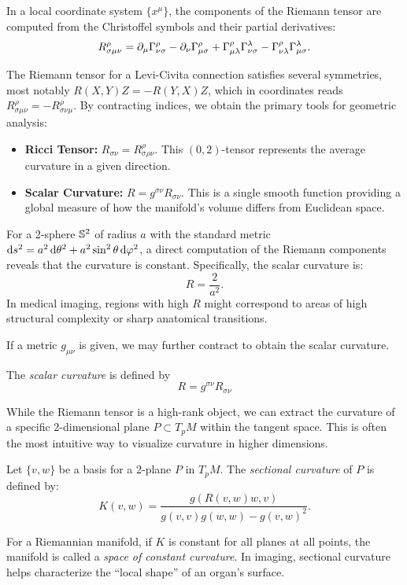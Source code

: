 In a local coordinate system $\{x^\mu\}$, the components of the Riemann tensor are computed from the Christoffel symbols and their partial derivatives:
\[%
  R^\rho_{\sigma\mu\nu} = \pd{\mu} \Gamma^\rho_{\nu\sigma} - \pd{\nu} \Gamma^\rho_{\mu\sigma} + \Gamma^\rho_{\mu\lambda} \Gamma^\lambda_{\nu\sigma} - \Gamma^\rho_{\nu\lambda} \Gamma^\lambda_{\mu\sigma}
.\]%

The Riemann tensor for a Levi-Civita connection satisfies several symmetries, most notably $R(X,Y)Z = -R(Y,X)Z$, which in coordinates reads $R^\rho_{\sigma\mu\nu} = -R^\rho_{\sigma\nu\mu}$. By contracting indices, we obtain the primary tools for geometric analysis:
\begin{itemize}
  \item \textbf{Ricci Tensor:} $R_{\sigma\nu} = R^\rho_{\sigma\rho\nu}$. This $(0,2)$-tensor represents the average curvature in a given direction.
  \item \textbf{Scalar Curvature:} $R = g^{\sigma\nu} R_{\sigma\nu}$. This is a single smooth function providing a global measure of how the manifold's volume differs from Euclidean space.
\end{itemize}

\begin{example}
  For a 2-sphere $\S^2$ of radius $a$ with the standard metric $\ds^2 = a^2 \dd{\theta}^2 + a^2 \sin^2 \theta \dd{\phi}^2$, a direct computation of the Riemann components reveals that the curvature is constant. Specifically, the scalar curvature is:
  \[%
    R = \frac{2}{a^2}
  .\]%
  In medical imaging, regions with high $R$ might correspond to areas of high structural complexity or sharp anatomical transitions.
\end{example}

If a metric $g_{\mu\nu}$ is given, we may further contract to obtain the scalar curvature.

\begin{definition}
  The \emph{scalar curvature} is defined by
  \[%
    R = g^{\sigma\nu} R_{\sigma\nu}
  \]%
\end{definition}

While the Riemann tensor is a high-rank object, we can extract the curvature of a specific 2-dimensional plane $P \subset T_pM$ within the tangent space. This is often the most intuitive way to visualize curvature in higher dimensions.
\begin{definition}
  Let $\{v, w\}$ be a basis for a 2-plane $P$ in $T_pM$. The \emph{sectional curvature} of $P$ is defined by:
  \[%
    K(v,w) = \frac{g(R(v,w)w, v)}{g(v,v)g(w,w) - g(v,w)^2}
  .\]%
\end{definition}
For a Riemannian manifold, if $K$ is constant for all planes at all points, the manifold is called a \emph{space of constant curvature}. In imaging, sectional curvature helps characterize the ``local shape'' of an organ's surface.

